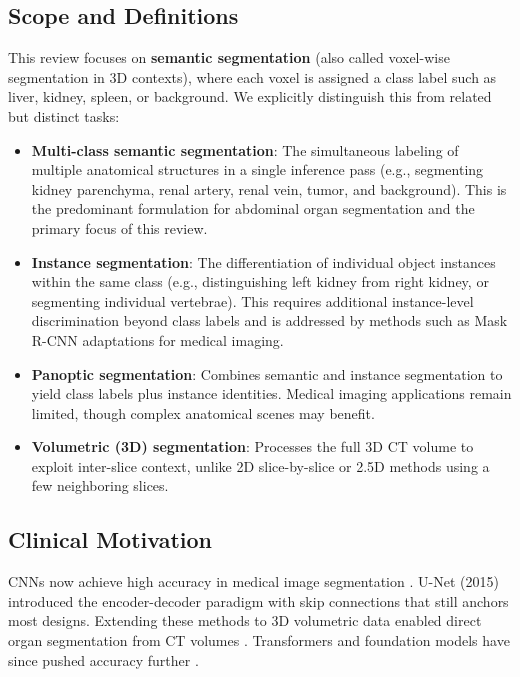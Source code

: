 \documentclass[conference]{IEEEtran}
\begin{document}
\subsection{Scope and Definitions}

This review focuses on \textbf{semantic segmentation} (also called voxel-wise segmentation in 3D contexts), where each voxel is assigned a class label such as liver, kidney, spleen, or background. We explicitly distinguish this from related but distinct tasks:

\begin{itemize}
    \item \textbf{Multi-class semantic segmentation}: The simultaneous labeling of multiple anatomical structures in a single inference pass (e.g., segmenting kidney parenchyma, renal artery, renal vein, tumor, and background). This is the predominant formulation for abdominal organ segmentation and the primary focus of this review.
    
    \item \textbf{Instance segmentation}: The differentiation of individual object instances within the same class (e.g., distinguishing left kidney from right kidney, or segmenting individual vertebrae). This requires additional instance-level discrimination beyond class labels and is addressed by methods such as Mask R-CNN adaptations for medical imaging.
    
    \item \textbf{Panoptic segmentation}: Combines semantic and instance segmentation to yield class labels plus instance identities. Medical imaging applications remain limited, though complex anatomical scenes may benefit.
    
    \item \textbf{Volumetric (3D) segmentation}: Processes the full 3D CT volume to exploit inter-slice context, unlike 2D slice-by-slice or 2.5D methods using a few neighboring slices.
\end{itemize}

\subsection{Clinical Motivation}

CNNs now achieve high accuracy in medical image segmentation \cite{ronneberger2015unet}. U-Net (2015) introduced the encoder-decoder paradigm with skip connections that still anchors most designs. Extending these methods to 3D volumetric data enabled direct organ segmentation from CT volumes \cite{cicek20163dunet}. Transformers and foundation models have since pushed accuracy further \cite{shamshad2023transformers}.
\end{document}
